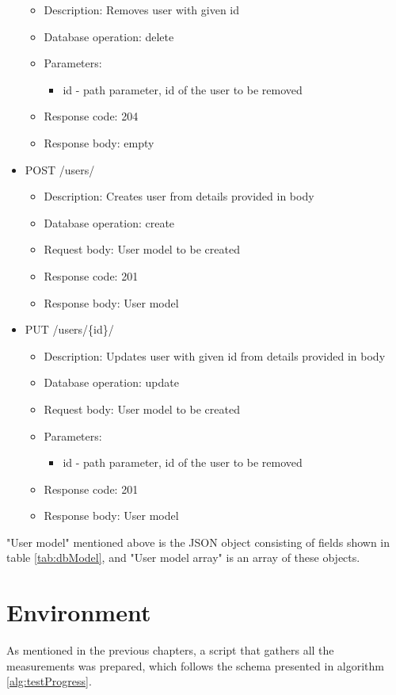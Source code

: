 \begin{itemize}
        \begin{itemize}
          \item Description: Removes user with given id
          \item Database operation: delete
          \item Parameters:
                \begin{itemize}
                  \item id - path parameter, id of the user to be removed
                \end{itemize}
          \item Response code: 204
          \item Response body: empty
        \end{itemize}
  \item POST /users/
        \begin{itemize}
          \item Description: Creates user from details provided in body
          \item Database operation: create
          \item Request body: User model to be created
          \item Response code: 201
          \item Response body: User model
        \end{itemize}
  \item PUT /users/\{id\}/
        \begin{itemize}
          \item Description: Updates user with given id from details provided in body
          \item Database operation: update
          \item Request body: User model to be created
          \item Parameters:
                \begin{itemize}
                  \item id - path parameter, id of the user to be removed
                \end{itemize}
          \item Response code: 201
          \item Response body: User model
        \end{itemize}
\end{itemize}

"User model" mentioned above is the JSON object consisting of fields shown in table \ref{tab:dbModel}, and "User model array" is an array of these objects.

\section{Environment}

As mentioned in the previous chapters, a script that gathers all the measurements was prepared, which follows the schema presented in algorithm \ref{alg:testProgress}.

